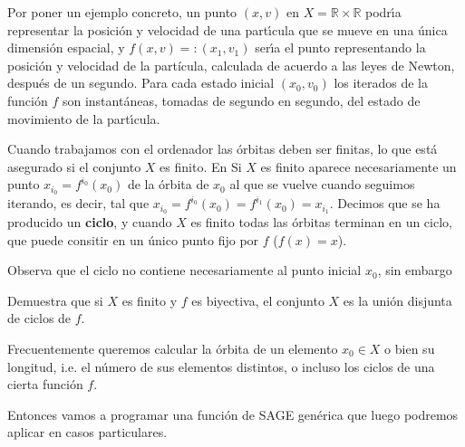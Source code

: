 Por poner un ejemplo concreto, un punto $(x,v)$ en $X=\mathbb{R}\times
\mathbb{R}$ podr\'{\i}a representar la posici\'on y velocidad de una
part\'{\i}cula que se mueve en una \'unica dimensi\'on espacial, y
$f(x,v)=:(x_1,v_1)$ ser\'{\i}a  el punto representando la posici\'on y velocidad
de la part\'icula, calculada de acuerdo a las leyes de Newton, despu\'es de un
segundo. Para cada estado inicial $(x_0,v_0)$ los iterados de la funci\'on $f$
son instant\'aneas, tomadas de segundo en segundo, del estado de movimiento de
la part\'{\i}cula. 

Cuando trabajamos con el ordenador las \'orbitas deben ser finitas, lo que est\'a asegurado si el conjunto $X$ es finito.  En Si $X$ es finito aparece necesariamente un  punto $x_{i_0}=f^{i_0}(x_0)$ de la
\'orbita de $x_0$ al que se vuelve cuando seguimos iterando, es decir, tal que
$x_{i_0}=f^{i_0}(x_0)=f^{i_1}(x_0)=x_{i_1}$. 
Decimos que se ha producido un {\bf ciclo}, y cuando $X$ es finito todas las
\'orbitas terminan en un ciclo, que puede consitir en un \'unico punto fijo por
$f$ ($f(x)=x$). 

Observa que el ciclo no contiene necesariamente al punto inicial $x_0$, sin
embargo
\par
\medskip
\par
\begin{ejer}
Demuestra que si $X$ es finito y $f$ es biyectiva,  el conjunto
$X$ es la uni\'on disjunta de ciclos de $f$. 
\end{ejer}

Frecuentemente queremos calcular la \'orbita de un elemento $x_0\in X$ o bien su
longitud, i.e. el n\'umero de sus elementos distintos, o incluso los ciclos de
una cierta funci\'on $f$. 



Entonces vamos a programar una funci\'on de SAGE gen\'erica que luego podremos
aplicar en casos particulares. 

